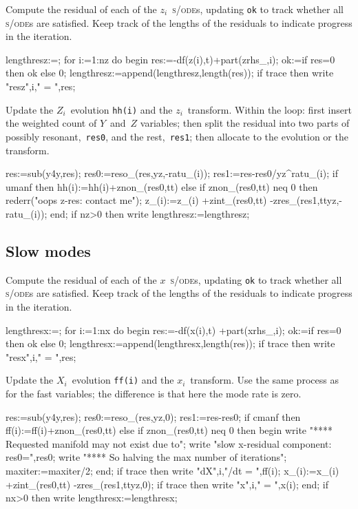 \documentclass[11pt,a5paper]{article}
\def\sde{\textsc{s/ode}}
\begin{document}
Compute the residual of each of the $z_i$~\sde{}s, updating
\verb|ok| to track whether all \sde{}s are satisfied.  Keep
track of the lengths of the residuals to indicate progress
in the iteration.
\begin{reduce}
  lengthresz:={};
  for i:=1:nz do begin  
    res:=-df(z(i),t)+part(zrhs_,i);
    ok:=if res=0 then ok else 0;
    lengthresz:=append(lengthresz,{length(res)});
    if trace then write "resz",i," = ",res;
\end{reduce}
Update the $Z_i$~evolution \verb|hh(i)| and the
$z_i$~transform. Within the loop: first insert the weighted
count of $Y$~and~$Z$ variables; then split the residual into
two parts of possibly resonant,~\verb|res0|, and the
rest,~\verb|res1|; then allocate to the evolution or the
transform.
\begin{reduce}
    res:=sub(y4y,res);
    res0:=reso_(res,yz,-ratu_(i));
    res1:=res-res0/yz^ratu_(i);
    if umanf then hh(i):=hh(i)+znon_(res0,tt)
    else if znon_(res0,tt) neq 0 
        then rederr("oops z-res: contact me");
    z_(i):=z_(i) +zint_(res0,tt) -zres_(res1,ttyz,-ratu_(i));
  end;
  if nz>0 then write lengthresz:=lengthresz;
\end{reduce}





\subsection{Slow modes}

Compute the residual of each of the $x$~\sde{}s, updating
\verb|ok| to track whether all \sde{}s are satisfied.  Keep
track of the lengths of the residuals to indicate progress
in the iteration.
\begin{reduce}
  lengthresx:={};
  for i:=1:nx do begin
    res:=-df(x(i),t) +part(xrhs_,i);
    ok:=if res=0 then ok else 0;
    lengthresx:=append(lengthresx,{length(res)});
    if trace then write "resx",i," = ",res;
\end{reduce}
Update the $X_i$~evolution \verb|ff(i)| and the
$x_i$~transform. Use the same process as for the fast
variables; the difference is that here the mode rate is
zero.
\begin{reduce}
    res:=sub(y4y,res);
    res0:=reso_(res,yz,0);
    res1:=res-res0;
    if cmanf then ff(i):=ff(i)+znon_(res0,tt)
    else if znon_(res0,tt) neq 0 then begin
        write "**** Requested manifold may not exist due to";
        write "slow x-residual component: res0=",res0;
        write "**** So halving the max number of iterations";
        maxiter:=maxiter/2;
    end;
    if trace then write "dX",i,"/dt = ",ff(i);
    x_(i):=x_(i) +zint_(res0,tt) -zres_(res1,ttyz,0);
    if trace then write "x",i," = ",x(i);
  end;
  if nx>0 then write lengthresx:=lengthresx;
\end{reduce}
\end{document}
